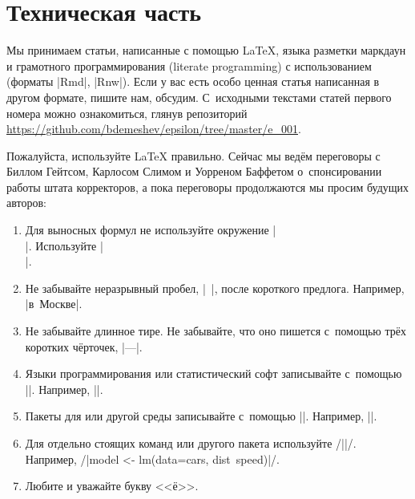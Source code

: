 \documentclass[11pt]{article}
\begin{document}
\section{Техническая часть}


Мы принимаем статьи, написанные с помощью \LaTeX, языка разметки маркдаун и грамотного программирования (literate programming) с использованием  (форматы \code|Rmd|, \code|Rnw|). Если у вас есть особо ценная статья написанная в другом формате, пишите нам, обсудим. С~исходными текстами статей первого номера можно ознакомиться, глянув репозиторий \url{https://github.com/bdemeshev/epsilon/tree/master/e_001}.

Пожалуйста, используйте \LaTeX{} правильно. Сейчас мы ведём переговоры с Биллом Гейтсом, Карлосом Слимом и Уорреном Баффетом о~спонсировании работы штата корректоров, а пока переговоры продолжаются мы просим будущих авторов:

\begin{enumerate}
\item Для выносных формул не используйте окружение \code|$$ $$|. Используйте \code|\[ \]|.
\item Не забывайте неразрывный пробел, \code|~|, после короткого предлога. Например, \code|в~Москве|.
\item Не забывайте длинное тире. Не забывайте, что оно пишется с~помощью трёх коротких чёрточек, \code|---|.
\item Языки программирования или статистический софт записывайте с~помощью \code|\proglang{}|. Например, \code||.
\item Пакеты для  или другой среды записывайте с~помощью \code|\pkg{}|. Например, \code||.
\item Для отдельно стоящих команд  или другого пакета используйте \code/\code||/. Например, \code/\code|model <- lm(data=cars, dist~speed)|/.
\item Любите и уважайте букву <<ё>>.
\end{enumerate}
\end{document}
